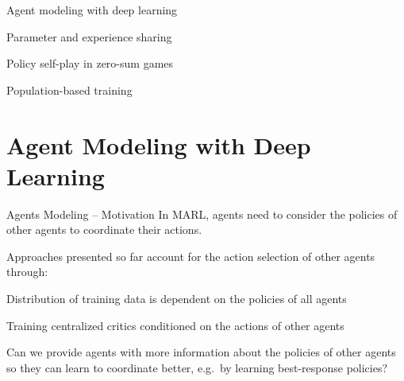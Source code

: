 

\otherslide

\subtitle{Multi-Agent Deep Reinforcement Learning -- Part 2}


\maketitle

\introslide

\begin{frame}{\outline}

\blist
    \item Agent modeling with deep learning
    \item Parameter and experience sharing
    \item Policy self-play in zero-sum games
    \item Population-based training
\elist
\end{frame}

\section{Agent Modeling with Deep Learning}

\begin{frame}[t]{Agents Modeling -- Motivation}
    In MARL, agents need to consider the policies of other agents to coordinate their actions.

    \pause

    Approaches presented so far account for the action selection of other agents through:
    \blist
        \item Distribution of training data is dependent on the policies of all agents
        \item Training centralized critics conditioned on the actions of other agents
    \elist

    \pause

    \begin{problembox}
        Can we provide agents with more  information about the policies of other agents so they can learn to coordinate better, e.g.\ by learning best-response policies?
    \end{problembox}
\end{frame}

